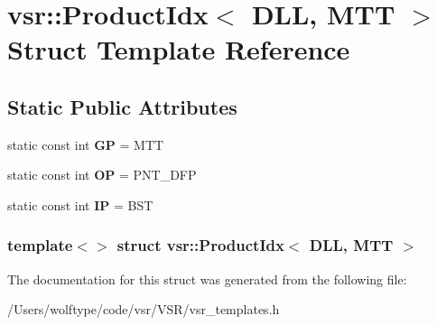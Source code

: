 \hypertarget{structvsr_1_1_product_idx_3_01_d_l_l_00_01_m_t_t_01_4}{\section{vsr\-:\-:Product\-Idx$<$ D\-L\-L, M\-T\-T $>$ Struct Template Reference}
\label{structvsr_1_1_product_idx_3_01_d_l_l_00_01_m_t_t_01_4}
}
\subsection*{Static Public Attributes}
\begin{DoxyCompactItemize}
\item 
\hypertarget{structvsr_1_1_product_idx_3_01_d_l_l_00_01_m_t_t_01_4_a256c0f8d842f87aad62046a58cf4e62e}{static const int {\bfseries G\-P} = M\-T\-T}\label{structvsr_1_1_product_idx_3_01_d_l_l_00_01_m_t_t_01_4_a256c0f8d842f87aad62046a58cf4e62e}

\item 
\hypertarget{structvsr_1_1_product_idx_3_01_d_l_l_00_01_m_t_t_01_4_aafea6a7d3bc07854503041be8eee3826}{static const int {\bfseries O\-P} = P\-N\-T\-\_\-\-D\-F\-P}\label{structvsr_1_1_product_idx_3_01_d_l_l_00_01_m_t_t_01_4_aafea6a7d3bc07854503041be8eee3826}

\item 
\hypertarget{structvsr_1_1_product_idx_3_01_d_l_l_00_01_m_t_t_01_4_adf7c4f05cfe629988ae74b5efa9b20de}{static const int {\bfseries I\-P} = B\-S\-T}\label{structvsr_1_1_product_idx_3_01_d_l_l_00_01_m_t_t_01_4_adf7c4f05cfe629988ae74b5efa9b20de}

\end{DoxyCompactItemize}
\subsubsection*{template$<$$>$ struct vsr\-::\-Product\-Idx$<$ D\-L\-L, M\-T\-T $>$}



The documentation for this struct was generated from the following file\-:\begin{DoxyCompactItemize}
\item 
/\-Users/wolftype/code/vsr/\-V\-S\-R/vsr\-\_\-templates.\-h\end{DoxyCompactItemize}
